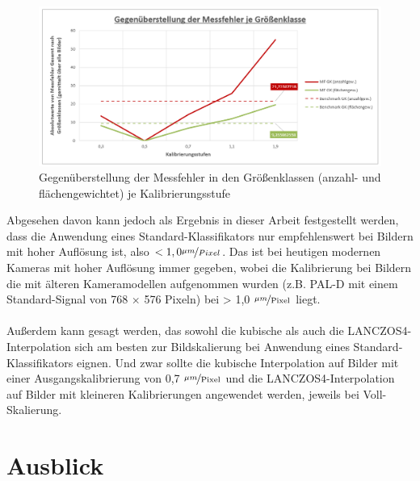 \documentclass[
fontsize=10pt, 
listof = totoc,
parskip = half	
]{report}
\begin{document}
\begin{figure}[H]
	\centering
	\includegraphics[width=\textwidth, height=\textheight, keepaspectratio]{pics/DA_Gesamt_GK_Kalib_Benchmark}
	\caption{Gegenüberstellung der Messfehler in den Größenklassen (anzahl- und flächengewichtet) je Kalibrierungsstufe}
	\label{fig:DAGesamtKalibBenchmark}
\end{figure}

\noindent Abgesehen davon kann jedoch als Ergebnis in dieser Arbeit festgestellt werden, dass die Anwendung eines Standard-Klassifikators nur empfehlenswert bei Bildern mit hoher Auflösung ist, also $< 1,0 \nicefrac{\mu m}{Pixel}$. Das ist bei heutigen modernen Kameras mit hoher Auflösung immer gegeben, wobei die Kalibrierung bei Bildern die mit älteren Kameramodellen  aufgenommen wurden (z.B. PAL-D mit einem Standard-Signal von 768 $\times$ 576 Pixeln) bei > 1,0 $\nicefrac{\mu m}{\text{Pixel}}$ liegt. 
\\\\
\noindent Außerdem kann gesagt werden, das sowohl die kubische als auch die LANCZOS4-Interpolation sich am besten zur Bildskalierung bei Anwendung eines Standard-Klassifikators eignen. Und zwar sollte die kubische Interpolation auf Bilder mit einer Ausgangskalibrierung von 0,7 $\nicefrac{\mu m}{\text{Pixel}}$ und die LANCZOS4-Interpolation auf Bilder mit kleineren Kalibrierungen angewendet werden, jeweils bei Voll-Skalierung.

\section{Ausblick}
\label{sec:Ausblick}
\end{document}
